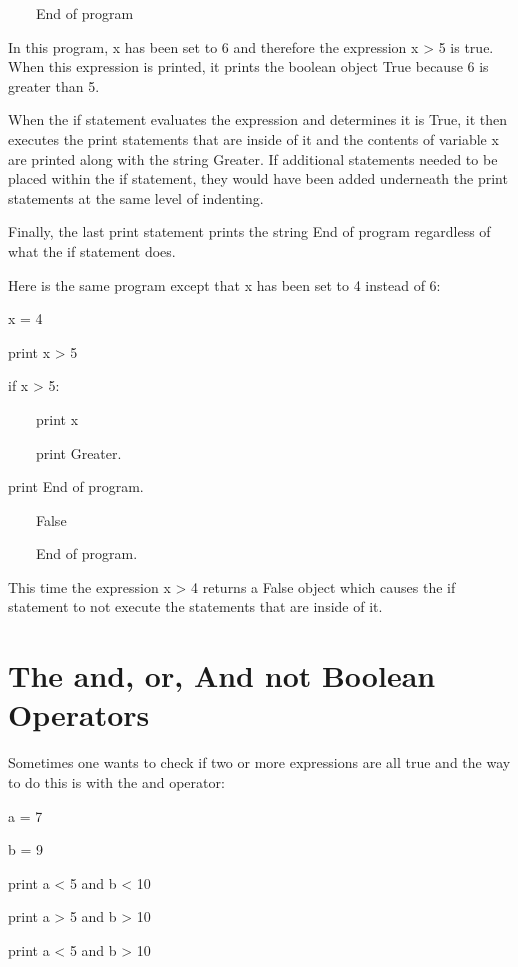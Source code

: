 \documentclass[12pt,oneside]{book}
\begin{document}
\ \ \ \ End of program

In this program, x has been set to 6 and therefore the expression x {\textgreater} 5 is true. When this expression is printed, it prints the boolean object True because 6 is greater than 5. 

When the if statement evaluates the expression and determines it is True, it then executes the print statements that are inside of it and the contents of variable x are printed along with the string {\textquotedbl}Greater{\textquotedbl}. If additional statements needed to be placed within the if statement, they would have been added underneath the print statements at the same level of indenting. 

Finally, the last print statement prints the string {\textquotedbl}End of program{\textquotedbl} regardless of what the if statement does. 

Here is the same program except that x has been set to 4 instead of 6:


x = 4


print x {\textgreater} 5


if x {\textgreater} 5:

\ \ \ \ print x

\ \ \ \ print {\textquotedbl}Greater.{\textquotedbl}


print {\textquotedbl}End of program.{\textquotedbl}

{\textbar}

\ \ \ \ False

\ \ \ \ End of program.

This time the expression x {\textgreater} 4 returns a False object which causes the if statement to not execute the statements that are inside of it.

\section[The and, or, And not Boolean Operators]{The and, or, And not Boolean Operators}

Sometimes one wants to check if two or more expressions are all true and the way to do this is with the and operator: 

a = 7

b = 9

print a {\textless} 5 and b {\textless} 10

print a {\textgreater} 5 and b {\textgreater} 10

print a {\textless} 5 and b {\textgreater} 10
\end{document}
